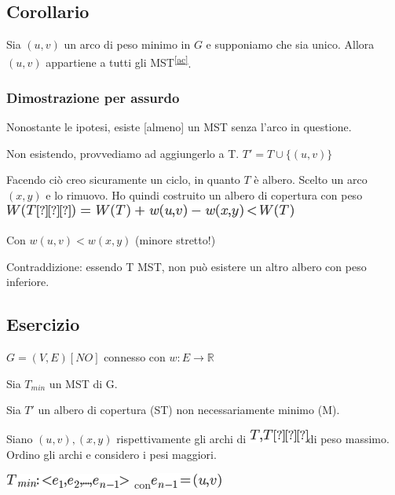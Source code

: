 \documentclass{article}
\begin{document}
{{\subsection{Corollario}

{Sia $(u,v)$ un arco di peso minimo in $G$ e supponiamo che sia unico. Allora $(u,v)$ appartiene a tutti gli MST}\textsuperscript{\protect\hyperlink{cmnt29}{{[}ac{]}}}{.}

\subsubsection{Dimostrazione per assurdo}

{Nonostante le ipotesi, esiste {[}almeno{]} un MST senza l'arco in
questione.}

{Non esistendo, provvediamo ad aggiungerlo a T. $T' = T \cup \{(u,v)\}$}

{Facendo ciò creo sicuramente un ciclo, in quanto $T$ è albero. Scelto un arco $(x,y)$ e lo rimuovo. Ho quindi costruito un albero di copertura con peso}\includegraphics{images/image470.png}

{Con $w(u,v) < w(x,y)$ (minore stretto!)}

{Contraddizione}{: essendo T MST, non può esistere un altro albero con
peso inferiore.}

\subsection{Esercizio}

$G=(V,E) [NO]$ connesso con $w:E \rightarrow \mathbb{R}$

{Sia $T_{min}$ un MST di G.}

{Sia $T'$ un albero di copertura (ST) non necessariamente minimo (M).}

{Siano $(u,v),(x,y)$ rispettivamente gli archi
di }\includegraphics{images/image475.png}{di peso massimo. Ordino gli
archi e considero i pesi maggiori.}

\includegraphics{images/image476.png}{~con}\includegraphics{images/image477.png}

}}
\end{document}
